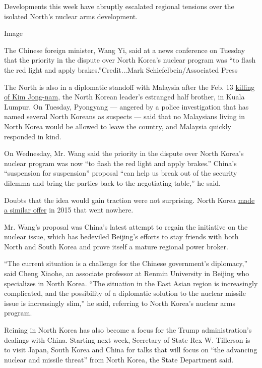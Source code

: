 Developments this week have abruptly escalated regional tensions over
the isolated North's nuclear arms development.

Image

The Chinese foreign minister, Wang Yi, said at a news conference on
Tuesday that the priority in the dispute over North Korea's nuclear
program was ``to flash the red light and apply brakes.''Credit...Mark
Schiefelbein/Associated Press

The North is also in a diplomatic standoff with Malaysia after the Feb.
13
\href{https://www.nytimes.com/2017/02/22/world/asia/kim-jong-nam-assassination-korea-malaysia.html}{killing
of Kim Jong-nam}, the North Korean leader's estranged half brother, in
Kuala Lumpur. On Tuesday, Pyongyang --- angered by a police
investigation that has named several North Koreans as suspects --- said
that no Malaysians living in North Korea would be allowed to leave the
country, and Malaysia quickly responded in kind.

On Wednesday, Mr. Wang said the priority in the dispute over North
Korea's nuclear program was now ``to flash the red light and apply
brakes.'' China's ``suspension for suspension'' proposal ``can help us
break out of the security dilemma and bring the parties back to the
negotiating table,'' he said.

Doubts that the idea would gain traction were not surprising. North
Korea
\href{https://www.nytimes.com/2015/01/11/world/asia/north-korea-offers-us-deal-to-halt-nuclear-test-.html}{made
a similar offer} in 2015 that went nowhere.

Mr. Wang's proposal was China's latest attempt to regain the initiative
on the nuclear issue, which has bedeviled Beijing's efforts to stay
friends with both North and South Korea and prove itself a mature
regional power broker.

``The current situation is a challenge for the Chinese government's
diplomacy,'' said Cheng Xiaohe, an associate professor at Renmin
University in Beijing who specializes in North Korea. ``The situation in
the East Asian region is increasingly complicated, and the possibility
of a diplomatic solution to the nuclear missile issue is increasingly
slim,'' he said, referring to North Korea's nuclear arms program.

Reining in North Korea has also become a focus for the Trump
administration's dealings with China. Starting next week, Secretary of
State Rex W. Tillerson is to visit Japan, South Korea and China for
talks that will focus on ``the advancing nuclear and missile threat''
from North Korea, the State Department said.

